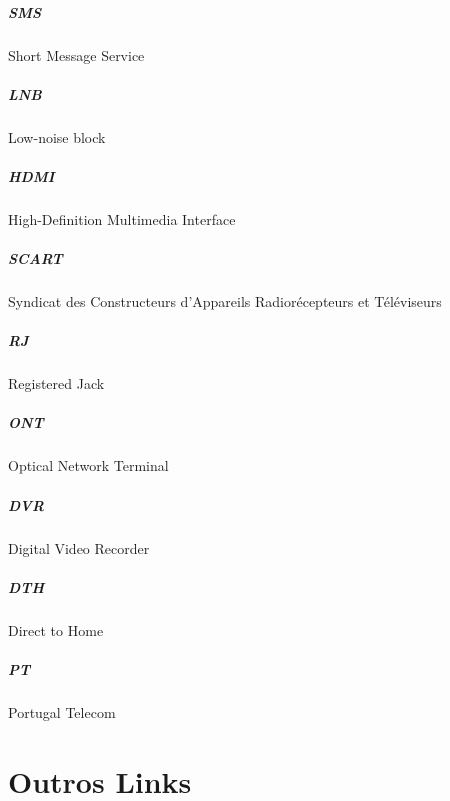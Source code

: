 \documentclass{report}
\begin{document}
\paragraph{SMS} Short Message Service
\paragraph{LNB} Low-noise block
\paragraph{HDMI} High-Definition Multimedia Interface 
\paragraph{SCART} Syndicat des Constructeurs d'Appareils Radiorécepteurs et Téléviseurs
\paragraph{RJ} Registered Jack
\paragraph{ONT} Optical Network Terminal
\paragraph{DVR} Digital Video Recorder
\paragraph{DTH} Direct to Home
\paragraph{PT} Portugal Telecom

\chapter*{Outros Links}
\end{document}
